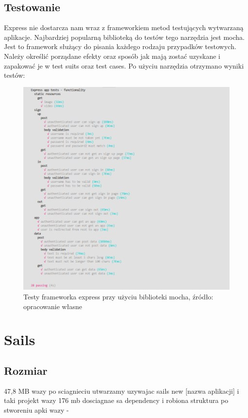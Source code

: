 \documentclass[12pt]{report}
\begin{document}
    \subsection{Testowanie}
    Express nie dostarcza nam wraz z frameworkiem metod testujących wytwarzaną aplikacje. 
    Najbardziej popularną biblioteką do testów tego narzędzia jest mocha.
    Jest to framework służący do pisania każdego rodzaju przypadków testowych.
    Należy określić porządane efekty oraz sposób jak mają zostać uzyskane i zapakować je w test suits oraz test cases.
    Po użyciu narzędzia otrzymano wyniki testów:
    \begin{figure}[!hb]
      \centering
      \includegraphics[width=\textwidth,height=\textheight,keepaspectratio]{test_express.png} 
      \caption{Testy frameworka express przy użyciu biblioteki mocha, źródło: opracowanie własne}
    \end{figure}

  \section{Sails}
    \subsection{Rozmiar}
    47,8 MB wazy po sciagnieciu 
    utwarzamy uzywajac sails new [nazwa aplikacji]
    i taki projekt wazy 176 mb dosciagnae sa dependency i robiona struktura
    po stworeniu apki wazy - 
\end{document}
